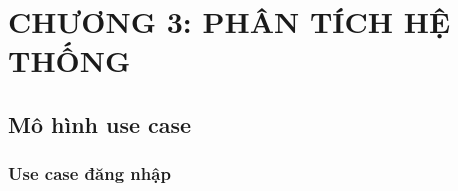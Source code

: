 \documentclass{article}
\begin{document}
	






	
		\fontsize{14}{20}\selectfont
		
		\section*{CHƯƠNG 3: PHÂN TÍCH HỆ THỐNG}
		\fontsize{14}{20}\selectfont
		\setcounter{section}{3}
		\subsection{ Mô hình use case }
	
		
		\fontsize{14}{20}\selectfont
		\subsubsection{Use case đăng nhập}
		\fontsize{13}{13}\selectfont
\end{document}
